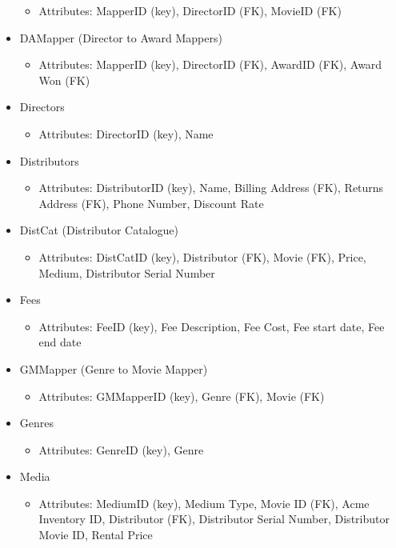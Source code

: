 \documentclass[letterpaper,12pt]{article}
\begin{document}
\begin{itemize}
\begin{itemize}
		      \item Attributes: MapperID (key), DirectorID (FK), MovieID (FK)
	      \end{itemize}
	\item DAMapper (Director to Award Mappers)
	      \begin{itemize}
		      \item Attributes: MapperID (key), DirectorID (FK), AwardID (FK), Award Won (FK)
	      \end{itemize}
	\item Directors
	      \begin{itemize}
		      \item Attributes: DirectorID (key), Name
	      \end{itemize}
	\item Distributors
	      \begin{itemize}
		      \item Attributes: DistributorID (key), Name, Billing Address (FK), Returns Address (FK), Phone Number, Discount Rate
	      \end{itemize}
	\item DistCat (Distributor Catalogue)
	      \begin{itemize}
		      \item Attributes: DistCatID (key), Distributor (FK), Movie (FK), Price, Medium, Distributor Serial Number
	      \end{itemize}
	\item Fees
	      \begin{itemize}
		      \item Attributes: FeeID (key), Fee Description, Fee Cost, Fee start date, Fee end date
	      \end{itemize}
	\item GMMapper (Genre to Movie Mapper)
	      \begin{itemize}
		      \item Attributes: GMMapperID (key), Genre (FK), Movie (FK)
	      \end{itemize}
	\item Genres
	      \begin{itemize}
		      \item Attributes: GenreID (key), Genre
	      \end{itemize}
	\item Media
	      \begin{itemize}
		      \item Attributes: MediumID (key), Medium Type, Movie ID (FK), Acme Inventory ID, Distributor (FK), Distributor Serial Number, Distributor Movie ID, Rental Price

\end{itemize}
\end{itemize}
\end{document}
